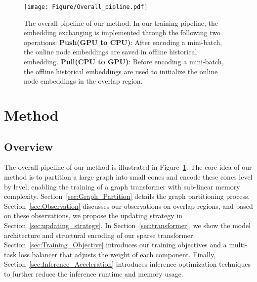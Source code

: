 \begin{figure}[]
    \centering

    \texttt{[image: Figure/Overall\_pipline.pdf]}
    
    \caption{ The overall pipeline of our method. In our training pipeline, the embedding exchanging is implemented through the following two operations: \textbf{Push(GPU to CPU)}: After encoding a mini-batch, the online node embeddings are saved in offline historical embedding. \textbf{Pull(CPU to GPU)}: Before encoding a mini-batch, the offline historical embeddings are used to initialize the online node embeddings in the overlap region.}
    \label{fig:Overall_pipline}
    \vspace{-10pt}
\end{figure}

\section{Method}



\subsection{Overview}

The overall pipeline of our method is illustrated in Figure~\ref{fig:Overall_pipline}. The core idea of our method is to partition a large graph into small cones and encode these cones level by level, enabling the training of a graph transformer with sub-linear memory complexity. Section~\ref{sec:Graph_Partition} details the graph partitioning process. Section~\ref{sec:Observation} discusses our observations on overlap regions, and based on these observations, we propose the updating strategy in Section~\ref{sec:updating_strategy}. In Section~\ref{sec:transformer}, we show the model architecture and structural encoding of our sparse transformer. Section~\ref{sec:Training_Objective}  introduces our training objectives and a multi-task loss balancer that adjusts the weight of each component. Finally, Section~\ref{sec:Inference_Acceleration} introduces inference optimization techniques to further reduce the inference runtime and memory usage. 


\vspace{-5pt}
